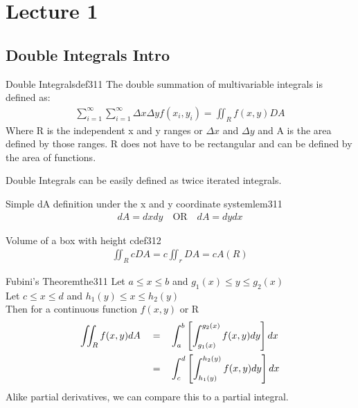 \section{Lecture 1}
\subsection{Double Integrals Intro}

\begin{definition}{Double Integrals}{def311}
    The double summation of multivariable integrals is defined as:
    \begin{gather*}
        \sum_{i=1}^{\infty}\sum_{i=1}^{\infty}\Delta x\Delta y f(x_i,y_i) 
        =
        \iint_R f(x,y) DA
    \end{gather*}
    Where R is the independent x and y ranges or $\Delta x$ and $\Delta y$ and A is the area defined by those ranges.
    R does not have to be rectangular and can be defined by the area of functions.
\end{definition}

Double Integrals can be easily defined as twice iterated integrals.

\begin{lenma}{Simple dA definition under the x and y coordinate system}{lem311}
    \begin{gather*}
        dA = dxdy \quad \text{OR} \quad dA = dydx
    \end{gather*}
\end{lenma}

\begin{definition}{Volume of a box with height c}{def312}
    \begin{gather*}
        \iint_R c DA = c\iint_r DA = cA(R)
    \end{gather*}
\end{definition}

\begin{theorem}{Fubini's Theorem}{the311}
    Let $a \le x \le b$ and $g_1(x) \le y \le g_2(x)$ \\
    Let $c \le x \le d$ and $h_1(y) \le x \le h_2(y)$ \\
    Then for a continuous function $f(x,y)$ or R
    \begin{align*}
        \iint_R f(x,y) dA \quad = & \quad \int_a^b\left[\int_{g_1(x)}^{g_2(x)} f(x,y)dy\right]dx \\
        \quad = & \quad \int_c^d\left[\int_{h_1(y)}^{h_2(y)} f(x,y)dy\right]dx
    \end{align*}
    Alike partial derivatives, we can compare this to a partial integral.
\end{theorem}

